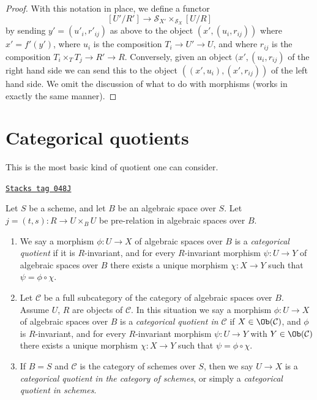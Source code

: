 \begin{proof}
\medskip\noindent
With this notation in place, we define a functor
$$
[U'/R'] \longrightarrow \mathcal{S}_{X'} \times_{\mathcal{S}_X} [U/R]
$$
by sending $y' = (u'_i, r'_{ij})$ as above to the object
$(x', (u_i, r_{ij}))$ where $x' = f'(y')$, where
$u_i$ is the composition $T_i \to U' \to U$, and where
$r_{ij}$ is the composition $T_i \times_T T_j \to R' \to R$.
Conversely, given an object $(x', (u_i, r_{ij})$
of the right hand side we can send this to the object
$((x', u_i), (x', r_{ij}))$ of the left hand side.
We omit the discussion of what to do with morphisms (works
in exactly the same manner).
\end{proof}

\section{Categorical quotients}
\label{groupoids-quotients-section-categorical}
This is the most basic kind of quotient one can consider.

\begin{definition}[Categorical]
\label{groupoids-quotients-definition-categorical}
\href{https://stacks.math.columbia.edu/tag/048J}{\texttt{Stacks tag 048J}}

Let $S$ be a scheme, and let $B$ be an algebraic space over $S$.
Let $j = (t, s) : R \to U \times_B U$ be pre-relation in algebraic spaces
over $B$.
\begin{enumerate}
\item We say a morphism $\phi : U \to X$ of algebraic spaces over $B$
is a {\it categorical quotient} if it is $R$-invariant, and
for every $R$-invariant morphism $\psi : U \to Y$ of algebraic spaces over $B$
there exists a unique morphism $\chi : X \to Y$ such that
$\psi = \phi \circ \chi$.
\item Let $\mathcal{C}$ be a full subcategory of the category of algebraic
spaces over $B$. Assume $U$, $R$ are objects of $\mathcal{C}$.
In this situation we say
a morphism $\phi : U \to X$ of algebraic spaces over $B$
is a {\it categorical quotient in $\mathcal{C}$}
if $X \in \Ob(\mathcal{C})$, and $\phi$ is $R$-invariant,
and for every $R$-invariant morphism
$\psi : U \to Y$ with $Y \in \Ob(\mathcal{C})$
there exists a unique morphism $\chi : X \to Y$ such
that $\psi = \phi \circ \chi$.
\item If $B = S$ and $\mathcal{C}$ is the category of schemes over $S$,
then we say $U \to X$ is a
{\it categorical quotient in the category of schemes}, or simply a
{\it categorical quotient in schemes}.
\end{enumerate}
\end{definition}


